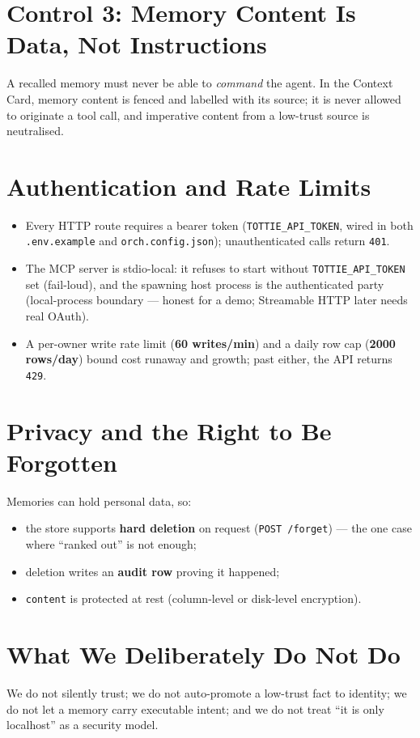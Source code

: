 \section{Control 3: Memory Content Is Data, Not Instructions}
A recalled memory must never be able to \emph{command} the agent. In the Context Card, memory content
is fenced and labelled with its source; it is never allowed to originate a tool call, and imperative
content from a low-trust source is neutralised.

\section{Authentication and Rate Limits}
\begin{itemize}
  \item Every HTTP route requires a bearer token (\texttt{TOTTIE\_API\_TOKEN}, wired in both \texttt{.env.example} and
  \texttt{orch.config.json}); unauthenticated calls return \texttt{401}.
  \item The MCP server is stdio-local: it refuses to start without \texttt{TOTTIE\_API\_TOKEN} set (fail-loud), and the spawning host process is the authenticated party (local-process boundary --- honest for a demo; Streamable HTTP later needs real OAuth).
  \item A per-owner write rate limit (\textbf{60 writes/min}) and a daily row cap (\textbf{2000
  rows/day}) bound cost runaway and growth; past either, the API returns \texttt{429}.
\end{itemize}

\section{Privacy and the Right to Be Forgotten}
Memories can hold personal data, so:
\begin{itemize}
  \item the store supports \textbf{hard deletion} on request (\texttt{POST /forget}) --- the one case
  where ``ranked out'' is not enough;
  \item deletion writes an \textbf{audit row} proving it happened;
  \item \texttt{content} is protected at rest (column-level or disk-level encryption).
\end{itemize}

\section{What We Deliberately Do Not Do}
We do not silently trust; we do not auto-promote a low-trust fact to identity; we do not let a memory
carry executable intent; and we do not treat ``it is only localhost'' as a security model.
